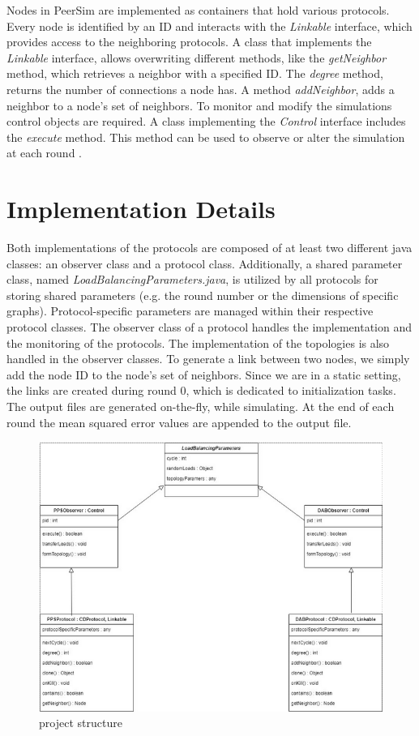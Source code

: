 Nodes in PeerSim are implemented as containers that hold various protocols. Every node is identified by an ID and interacts with the \textit{Linkable} interface, which provides 
access to the neighboring protocols. A class that implements the \textit{Linkable} interface, allows overwriting different methods, like the \textit{getNeighbor} method, which retrieves a neighbor with a specified ID. The \textit{degree} method, returns the number of connections a node has. A method \textit{addNeighbor}, adds a neighbor to a node's set of neighbors. To monitor and modify the simulations control objects are required. A class implementing the \textit{Control} interface includes the \textit{execute} method. This method can be used to observe or alter the simulation at each round \cite{peersimdocs}.

\section{Implementation Details}
Both implementations of the protocols are composed of at least two different java classes: an observer class and a protocol class. Additionally, a shared parameter class, named \textit{LoadBalancingParameters.java}, is utilized by all protocols for storing shared parameters (e.g. the round number or the dimensions of specific graphs). Protocol-specific parameters are managed within their respective protocol classes. The observer class of a protocol handles the implementation and the monitoring of the protocols. The implementation of the topologies is also handled in the observer classes. To generate a link between two nodes, we simply add the node ID to the node's set of neighbors. Since we are in a static setting, the links are created during round 0, which is dedicated to initialization tasks. The output files are generated on-the-fly, while simulating. At the end of each round the mean squared error values are appended to the output file.

\begin{figure}[H]
    \centering
    \includegraphics[scale=0.7]{figures/uml/projectArchUml.png}
    \caption{project structure}
    \label{fig:uml}
\end{figure}
